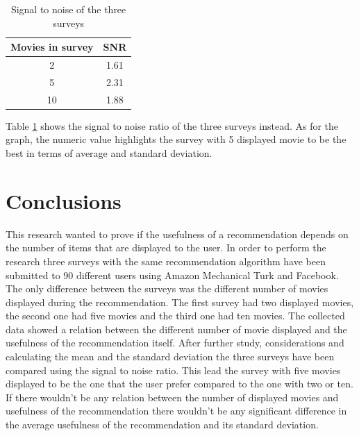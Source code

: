 \begin{table}
  \centering
  \begin{tabular}{| c | c |}
    \hline
    Movies in survey & SNR \\ \hline
    2 & 1.61 \\ \hline
    5 & 2.31  \\ \hline
    10 & 1.88  \\ \hline
  \end{tabular}
  \caption{Signal to noise of the three surveys}
  \label{tab:signal_to_noise}
\end{table}

Table \ref{tab:signal_to_noise} shows the signal to noise ratio of the three surveys instead. As for the graph, the numeric value highlights the survey with 5 displayed movie to be the best in terms of average and standard deviation. 

\section{Conclusions}
\label{sec:research_conclusions}

This research wanted to prove if the usefulness of a recommendation depends on the number of items that are displayed to the user. In order to perform the research three surveys with the same recommendation algorithm have been submitted to 90 different users using Amazon Mechanical Turk and Facebook. The only difference between the surveys was the different number of movies displayed during the recommendation. The first survey had two displayed movies, the second one had five movies and the third one had ten movies. 
The collected data showed a relation between the different number of movie displayed and the usefulness of the recommendation itself. After further study, considerations and calculating the mean and the standard deviation the three surveys have been compared using the signal to noise ratio.
This lead the survey with five movies displayed to be the one that the user prefer compared to the one with two or ten. If there wouldn't be any relation between the number of displayed movies and usefulness of the recommendation there wouldn't be any significant difference in the average usefulness of the recommendation and its standard deviation. 

\acresetall